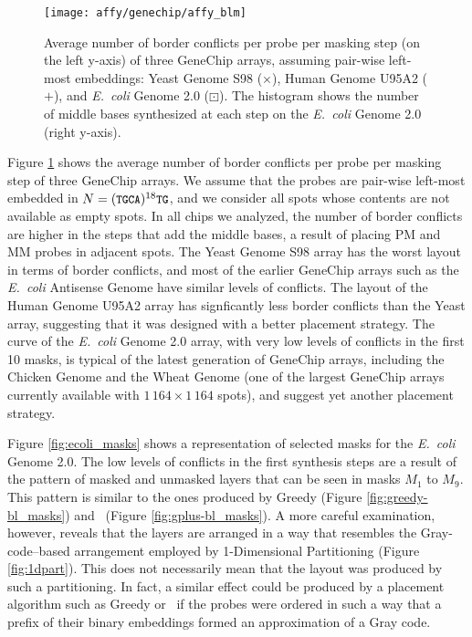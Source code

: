 \begin{figure}[t]\centering
\texttt{[image: affy/genechip/affy\_blm]}
\caption{\label{fig:affy_blm}%
  Average number of border conflicts per probe per masking step (on the left
  y-axis) of three GeneChip arrays, assuming pair-wise left-most embeddings:
  Yeast Genome S98 ({\scriptsize $\times$}), Human Genome U95A2 ({\tiny $+$}),
  and \emph{E.\ coli} Genome 2.0 ({\tiny $\boxdot$}). The histogram shows the
  number of middle bases synthesized at each step on the \emph{E.\ coli} Genome
  2.0 (right y-axis).}
\end{figure}

Figure \ref{fig:affy_blm} shows the average number of border conflicts per probe
per masking step of three GeneChip arrays. We assume that the probes are
pair-wise left-most embedded in $N=({\text{\small{\tt{TGCA}}}})^{18}{\text{\small{\tt{TG}}}}$, and we consider
all spots whose contents are not available as empty spots. In all chips we
analyzed, the number of border conflicts are higher in the steps that add the
middle bases, a result of placing PM and MM probes in adjacent spots. The Yeast
Genome S98 array has the worst layout in terms of border conflicts, and most of
the earlier GeneChip arrays such as the \emph{E.\ coli} Antisense Genome have similar
levels of conflicts. The layout of the Human Genome U95A2 array has signficantly
less border conflicts than the Yeast array, suggesting that it was designed with
a better placement strategy. The curve of the \emph{E.\ coli} Genome 2.0 array, with
very low levels of conflicts in the first 10 masks, is typical of the latest
generation of GeneChip arrays, including the Chicken Genome and the Wheat Genome
(one of the largest GeneChip arrays currently available with
$1\,164\times 1\,164$ spots), and suggest yet another placement strategy.

Figure \ref{fig:ecoli_masks} shows a representation of selected masks for the
\emph{E.\ coli} Genome 2.0. The low levels of conflicts in the first synthesis steps
are a result of the pattern of masked and unmasked layers that can be seen in
masks $M_1$ to $M_9$. This pattern is similar to the ones produced by Greedy
(Figure \ref{fig:greedy-bl_masks}) and \Greedyplus\ (Figure
\ref{fig:gplus-bl_masks}). A more careful examination, however, reveals that the
layers are arranged in a way that resembles the Gray-code--based arrangement
employed by 1-Dimensional Partitioning (Figure \ref{fig:1dpart}). This does not
necessarily mean that the layout was produced by such a partitioning. In fact, a
similar effect could be produced by a placement algorithm such as Greedy or
\Greedyplus\ if the probes were ordered in such a way that a prefix of their
binary embeddings formed an approximation of a Gray code.

